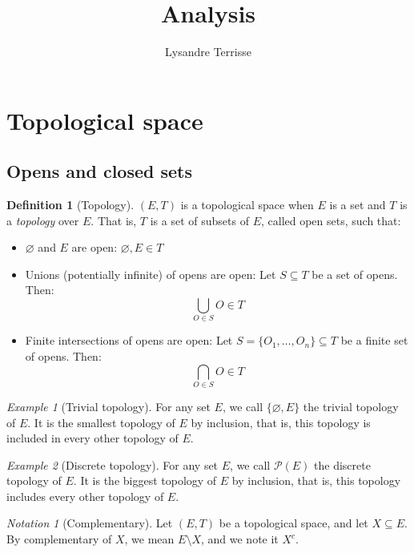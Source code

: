 \documentclass{article}
\title{Analysis}
\author{Lysandre Terrisse}
\theoremstyle{definition}
\newtheorem{definition}{Definition}[section]
\theoremstyle{remark}
\theoremstyle{example}
\newtheorem{example}{Example}[section]
\theoremstyle{notation}
\newtheorem{notation}{Notation}[section]
\begin{document}
\maketitle

\section{Topological space}

\subsection{Opens and closed sets}

\begin{definition}[Topology]
		$(E, T)$ is a topological space when $E$ is a set and $T$ is a \textit{topology} over $E$. That is, $T$ is a set of subsets of $E$, called open sets, such that:
		\begin{itemize}
				\item $\varnothing$ and $E$ are open: $\varnothing, E \in T$
				\item Unions (potentially infinite) of opens are open: Let $S \subseteq T$ be a set of opens. Then:
						$$\bigcup_{O \in S} O \in T$$
				\item Finite intersections of opens are open: Let $S = \{O_1, \dots, O_n\} \subseteq T$ be a finite set of opens. Then:
						$$\bigcap_{O \in S} O \in T$$
		\end{itemize}
\end{definition}

\begin{example}[Trivial topology]
		For any set $E$, we call $\{\varnothing, E\}$ the trivial topology of $E$. It is the smallest topology of $E$ by inclusion, that is, this topology is included in every other topology of $E$.
\end{example}

\begin{example}[Discrete topology]
		For any set $E$, we call $\mathcal{P}(E)$ the discrete topology of $E$. It is the biggest topology of $E$ by inclusion, that is, this topology includes every other topology of $E$.
\end{example}

\begin{notation}[Complementary]
		Let $(E, T)$ be a topological space, and let $X \subseteq E$. By complementary of $X$, we mean $E \setminus X$, and we note it $X^c$.
\end{notation}
\end{document}
